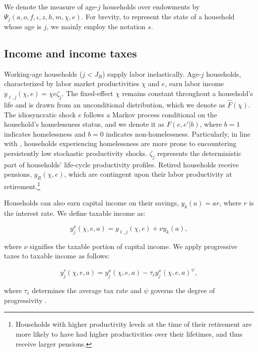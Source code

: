 \documentclass[parskip=full]{article}
\begin{document}
\noindent We denote the measure of age-$j$ households over endowments by $\Psi_{j}(a,o,f,\iota,z,h,m,\chi,e)$. For brevity, to represent the state of a household whose age is $j$, we mainly employ the notation $s$.

\subsection{Income and income taxes}\label{subsection:income}

Working-age households ($j<J_{R}$) supply labor inelastically. Age-$j$ households, characterized by labor market productivities $\chi$ and $e$, earn labor income $y_{\ell,j}(\chi,e)=\chi e\zeta_j$. The fixed-effect $\chi$ remains constant throughout a household's life and is drawn from an unconditional distribution, which we denote as $\hat{F}(\chi)$. The idiosyncratic shock $e$ follows a Markov process conditional on the household's homelessness status, and we denote it as $F(e,e'|b)$, where $b=1$ indicates homelessness and $b=0$ indicates non-homelessness. Particularly, in line with \citet{az-2024}, households experiencing homelessness are more prone to encountering persistently low stochastic productivity shocks. $\zeta_j$ represents the deterministic part of households' life-cycle productivity profiles. Retired households receive pensions, $y_{R}(\chi,e)$, which are contingent upon their labor productivity at retirement.\footnote{Households with higher productivity levels at the time of their retirement are more likely to have had higher productivities over their lifetimes, and thus receive larger pensions.}

Households can also earn capital income on their savings, $y_{k}(a)=ar$, where $r$ is the interest rate. We define taxable income as:

\begin{equation*}\label{eq:taxable_labor_income}
  y^{x}_{j}(\chi,e,a) =y_{\ell,j}(\chi,e)+\nu y_{k}(a),
\end{equation*}

\noindent where $\nu$ signifies the taxable portion of capital income. We apply progressive taxes to taxable income as follows:

\begin{equation}\label{eq:income_tax}
  y^{\tau}_{j}(\chi,e,a) = y^{x}_{j}(\chi,e,a)-\tau_{\ell}y^{x}_{j}(\chi,e,a)^{\psi},
\end{equation}

\noindent where $\tau_{\ell}$ determines the average tax rate and $\psi$ governs the degree of progressivity \citep{hsv-2020}.
\end{document}
